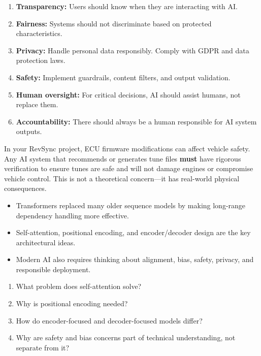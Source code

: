 \documentclass[12pt, a4paper, oneside]{book}
\begin{document}
\begin{enumerate}[leftmargin=2em]
    \item \textbf{Transparency:} Users should know when they are interacting with AI.
    \item \textbf{Fairness:} Systems should not discriminate based on protected characteristics.
    \item \textbf{Privacy:} Handle personal data responsibly. Comply with GDPR and data protection laws.
    \item \textbf{Safety:} Implement guardrails, content filters, and output validation.
    \item \textbf{Human oversight:} For critical decisions, AI should assist humans, not replace them.
    \item \textbf{Accountability:} There should always be a human responsible for AI system outputs.
\end{enumerate}

\begin{cautionbox}
In your RevSync project, ECU firmware modifications can affect vehicle safety. Any AI system that recommends or generates tune files \textbf{must} have rigorous verification to ensure tunes are safe and will not damage engines or compromise vehicle control. This is not a theoretical concern---it has real-world physical consequences.
\end{cautionbox}

\begin{summarybox}
\begin{itemize}[leftmargin=2em]
    \item Transformers replaced many older sequence models by making long-range dependency handling more effective.
    \item Self-attention, positional encoding, and encoder/decoder design are the key architectural ideas.
    \item Modern AI also requires thinking about alignment, bias, safety, privacy, and responsible deployment.
\end{itemize}
\end{summarybox}

\begin{recallbox}
\begin{enumerate}[leftmargin=2em]
    \item What problem does self-attention solve?
    \item Why is positional encoding needed?
    \item How do encoder-focused and decoder-focused models differ?
    \item Why are safety and bias concerns part of technical understanding, not separate from it?
\end{enumerate}
\end{recallbox}
\end{document}
